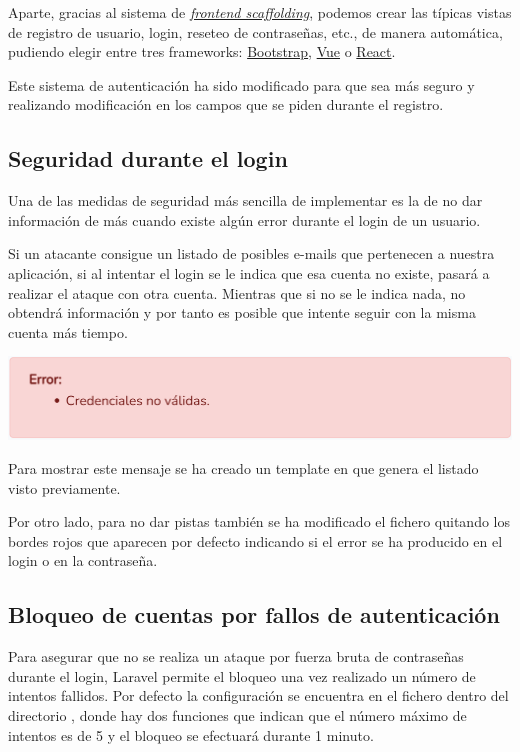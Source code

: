 \documentclass{\ClassPath/viu-tfm-template}
\begin{document}
Aparte, gracias al sistema de \textit{\href{https://laravel.com/docs/6.x/frontend}{frontend scaffolding}}, podemos crear las típicas vistas de registro de usuario, login, reseteo de contraseñas, etc., de manera automática, pudiendo elegir entre tres frameworks: \href{https://getbootstrap.com/}{Bootstrap}, \href{https://vuejs.org/}{Vue} o \href{https://es.reactjs.org/}{React}.

Este sistema de autenticación ha sido modificado para que sea más seguro y realizando modificación en los campos que se piden durante el registro.


\subsection{Seguridad durante el login}
Una de las medidas de seguridad más sencilla de implementar es la de no dar información de más cuando existe algún error durante el login de un usuario.

Si un atacante consigue un listado de posibles e-mails que pertenecen a nuestra aplicación, si al intentar el login se le indica que esa cuenta no existe, pasará a realizar el ataque con otra cuenta. Mientras que si no se le indica nada, no obtendrá información y por tanto es posible que intente seguir con la misma cuenta más tiempo.

\begin{center}
    \includegraphics[width=0.8\linewidth]{img/error_simple.png}
\end{center}

Para mostrar este mensaje se ha creado un template en  que genera el listado visto previamente.

Por otro lado, para no dar pistas también se ha modificado el fichero  quitando los bordes rojos que aparecen por defecto indicando si el error se ha producido en el login o en la contraseña.


\subsection{Bloqueo de cuentas por fallos de autenticación}
Para asegurar que no se realiza un ataque por fuerza bruta  de contraseñas durante el login, Laravel permite el bloqueo una vez realizado un número de intentos fallidos. Por defecto la configuración se encuentra en el fichero  dentro del directorio , donde hay dos funciones que indican que el número máximo de intentos es de 5 y el bloqueo se efectuará durante 1 minuto.
\end{document}
